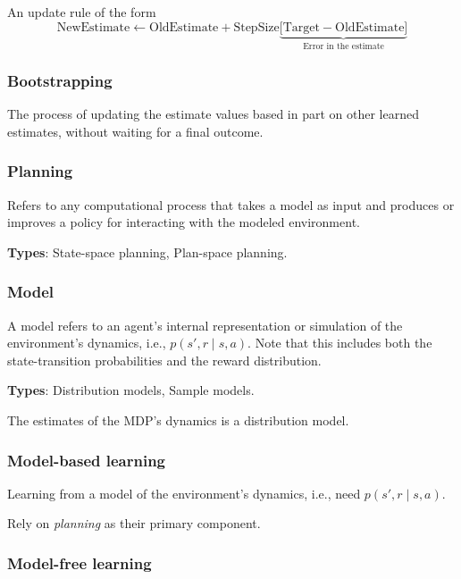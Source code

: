 An update rule of the form
\begin{equation}
    \text{NewEstimate} \leftarrow \text{OldEstimate} + \text{StepSize} \underbrace{ \Big[ \text{Target} - \text{OldEstimate} \Big] }_{\text{Error in the estimate}}
\end{equation}

\subsubsection{Bootstrapping}\label{sec:bootstrapping}

The process of updating the estimate values based in part on other learned estimates, without waiting for a final outcome.

\subsubsection{Planning}

Refers to any computational process that takes a model as input and produces or improves a policy for interacting with the modeled environment.

\textbf{Types}: State-space planning, Plan-space planning.

\subsubsection{Model}

A model refers to an agent's internal representation or simulation of the environment's dynamics, i.e., \( p(s', r \mid s, a) \).
Note that this includes both the state-transition probabilities and the reward distribution.

\textbf{Types}: Distribution models, Sample models.

The estimates of the MDP's dynamics  is a distribution model.

\subsubsection{Model-based learning}

Learning from a model of the environment’s dynamics, i.e., need \( p(s', r \mid s, a) \).

Rely on \textit{planning} as their primary component.

\subsubsection{Model-free learning}\label{sec:model-free-learning}

